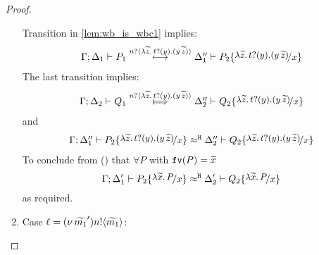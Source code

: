 \begin{proof}
\begin{enumerate}
				\noi Transition in \eqref{lem:wb_is_wbc1} implies:
				\[
					\begin{array}{l}
						\horel{\Gamma}{\Delta_1}{P_1}{\hby{\bactinp{n}{\auxtr{t}}}}{\Delta_1''}{P_2 \subst{\auxtr{t}}{x}}
					\end{array}
				\]
				\noi The last transition implies:
			\[
				\begin{array}{l}
					\horel{\Gamma}{\Delta_2}{Q_1}{\Hby{\bactinp{n}{\auxtr{t}}}}{\Delta_2''}{Q_2 \subst{\auxtr{t}}{x}}
				\end{array}
			\]
				\noi and
			\[
				\begin{array}{l}
					\horel{\Gamma}{\Delta_1''}{P_2 \subst{\auxtr{t}}{x}}{\hwb}{\Delta_2''}{Q_2 \subst{\auxtr{t}}{x}}
				\end{array}
			\]
				\noi To conclude from () that
				$\forall P$ with $\mathtt{fv}(P) = \widetilde{x}$
			\[
				\horel{\Gamma}{\Delta_1'}{P_2 \subst{\abs{\widetilde{x}}{P}}{x}}{\hwb}{\Delta_2'}{Q_2 \subst{\abs{\widetilde{x}}{P}}{x}}
			\]
				\noi as required.

		\item	Case $\ell = (\nu\, \widetilde{m_1}') n ! \langle \widetilde{m_1} \rangle$: 


\end{enumerate}
\end{proof}
